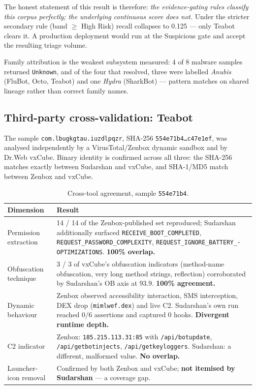 \documentclass{article}
\begin{document}
The honest statement of this result is therefore: \emph{the evidence-gating
rules classify this corpus perfectly; the underlying continuous score does not.}
Under the stricter secondary rule (band $\ge$ High Risk) recall collapses to
0.125 --- only Teabot clears it. A production deployment would run at the
Suspicious gate and accept the resulting triage volume.

Family attribution is the weakest subsystem measured: 4 of 8 malware samples
returned \texttt{Unknown}, and of the four that resolved, three were labelled
\emph{Anubis} (FluBot, Octo, Teabot) and one \emph{Hydra} (SharkBot) --- pattern
matches on shared lineage rather than correct family names.

\subsection{Third-party cross-validation: Teabot}
\label{ssec:teabot}

The sample \texttt{com.lbugkgtau.iuzdlpqzr}, SHA-256
\texttt{554e71b4\ldots c47e1ef}, was analysed independently by a
VirusTotal/Zenbox dynamic sandbox and by Dr.Web vxCube. Binary identity is
confirmed across all three: the SHA-256 matches exactly between Sudarshan and
vxCube, and SHA-1/MD5 match between Zenbox and vxCube.

\begin{table}[htb]
\centering
\caption{Cross-tool agreement, sample \texttt{554e71b4}.}
\label{tab:xtool}
\begin{tabular}{@{}p{2.8cm}p{4.6cm}@{}}
\toprule
\textbf{Dimension} & \textbf{Result} \\
\midrule
Permission extraction & 14 / 14 of the Zenbox-published set reproduced;
Sudarshan additionally surfaced \texttt{RECEIVE\_BOOT\_COMPLETED},
\texttt{REQUEST\_PASSWORD\_COMPLEXITY}, \texttt{REQUEST\_IGNORE\_BATTERY\_-
OPTIMIZATIONS}. \textbf{100\% overlap.} \\
\addlinespace
Obfuscation technique & 3 / 3 of vxCube's obfuscation indicators (method-name
obfuscation, very long method strings, reflection) corroborated by Sudarshan's
OB axis at 93.9. \textbf{100\% agreement.} \\
\addlinespace
Dynamic behaviour & Zenbox observed accessibility interaction, SMS
interception, DEX drop (\texttt{mimlwef.dex}) and live C2. Sudarshan's own run
reached 0/6 assertions and captured 0 hooks. \textbf{Divergent runtime depth.} \\
\addlinespace
C2 indicator & Zenbox: \texttt{185.215.113.31:85} with
\texttt{/api/botupdate}, \texttt{/api/getbotinjects},
\texttt{/api/getkeyloggers}. Sudarshan: a different, malformed value.
\textbf{No overlap.} \\
\addlinespace
Launcher-icon removal & Confirmed by both Zenbox and vxCube; \textbf{not
itemised by Sudarshan} --- a coverage gap. \\
\bottomrule
\end{tabular}
\end{table}
\end{document}
